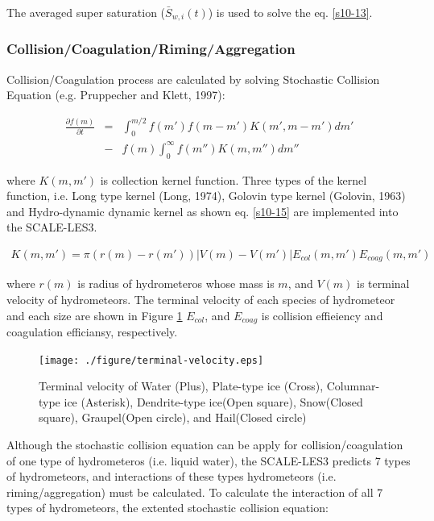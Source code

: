 The averaged super saturation ($\bar{S}_{w,i}(t)$) is used to solve the eq. \ref{s10-13}.

\subsubsection{Collision/Coagulation/Riming/Aggregation}
Collision/Coagulation process are calculated by solving Stochastic Collision Equation (e.g. Pruppecher and Klett, 1997):

\begin{eqnarray}
\frac{\partial f(m)}{\partial t}&=&\int_0^{m/2}f(m')f(m-m')K(m',m-m')dm' \nonumber\\
&-&f(m)\int_0^{\infty}f(m'')K(m,m'')dm''\label{s10-14}
\end{eqnarray}

where $K(m,m')$ is collection kernel function. Three types of the kernel function, i.e. Long type kernel (Long, 1974), Golovin type kernel (Golovin, 1963) and Hydro-dynamic dynamic kernel as shown eq. \ref{s10-15} are implemented into the SCALE-LES3.

\begin{eqnarray}
K(m,m')=\pi(r(m)-r(m'))\left| V(m)-V(m')\right |E_{col}(m,m')E_{coag}(m,m')\label{s10-15}
\end{eqnarray}

where $r(m)$ is radius of hydrometeros whose mass is $m$, and $V(m)$ is terminal velocity of hydrometeors. The terminal velocity of each species of hydrometeor and each size are shown in Figure \ref{figs10-term} $E_{col}$, and $E_{coag}$ is collision effieiency and coagulation efficiansy, respectively.\\

\begin{figure}[h]
\begin{center}
\texttt{[image: ./figure/terminal-velocity.eps]}
\end{center}
\caption{Terminal velocity of Water (Plus), Plate-type ice (Cross), Columnar-type ice (Asterisk), Dendrite-type ice(Open square), Snow(Closed square), Graupel(Open circle), and Hail(Closed circle)}
\label{figs10-term}
\end{figure}


Although the stochastic collision equation can be apply for collision/coagulation of one type of hydrometeros (i.e. liquid water), the SCALE-LES3 predicts 7 types of hydrometeors, and interactions of these types hydrometeors (i.e. riming/aggregation) must be calculated. To calculate the interaction of all 7 types of hydrometeors, the extented stochastic collision equation:

